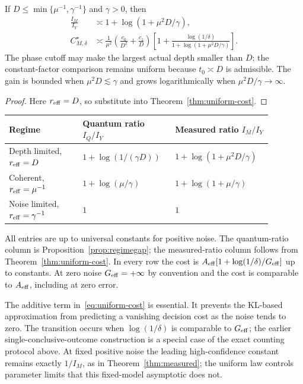 \begin{corollary}
\label{cor:depth-complete}
If $D\leq\min\{\mu^{-1},\gamma^{-1}\}$ and $\gamma>0$, then
\begin{align}
 \frac{I_M}{I_Y}&\asymp1+\log(1+\mu^2D/\gamma),
 \label{eq:depth-information}\\
 C_{M,\delta}^\star&\asymp
 \frac1{\mu^2}\left(\frac{c_0}{D^2}+\frac{c_1}{D}\right)
 \left[1+\frac{\log(1/\delta)}{1+\log(1+\mu^2D/\gamma)}\right].
 \label{eq:depth-complete}
\end{align}
The phase cutoff may make the largest actual depth smaller than $D$;
the constant-factor comparison remains uniform because $t_0\asymp D$
is admissible. The gain is bounded when $\mu^2D\lesssim\gamma$ and
grows logarithmically when $\mu^2D/\gamma\to\infty$.
\end{corollary}
\begin{proof}
Here $r_{\mathrm{eff}}=D$, so substitute into Theorem~\ref{thm:uniform-cost}.
\end{proof}

\begin{center}
\small
\begin{tabular}{p{0.26\linewidth}p{0.30\linewidth}p{0.32\linewidth}}
\toprule
Regime & Quantum ratio $I_Q/I_Y$ & Measured ratio $I_M/I_Y$\\
\midrule
Depth limited, $r_{\mathrm{eff}}=D$
& $1+\log(1/(\gamma D))$
& $1+\log(1+\mu^2D/\gamma)$\\
Coherent, $r_{\mathrm{eff}}=\mu^{-1}$
& $1+\log(\mu/\gamma)$
& $1+\log(1+\mu/\gamma)$\\
Noise limited, $r_{\mathrm{eff}}=\gamma^{-1}$
& $1$ & $1$\\
\bottomrule
\end{tabular}
\end{center}
All entries are up to universal constants for positive noise. The
quantum-ratio column is Proposition~\ref{prop:regimegap}; the
measured-ratio column follows from Theorem~\ref{thm:uniform-cost}.
In every row the cost is $A_{\rm eff}[1+\log(1/\delta)/G_{\rm eff}]$
up to constants. At zero noise $G_{\rm eff}=+\infty$ by convention and
the cost is comparable to $A_{\rm eff}$, including at zero error.

The additive term in~\eqref{eq:uniform-cost} is essential. It prevents
the KL-based approximation from predicting a vanishing decision cost
as the noise tends to zero. The transition occurs when
$\log(1/\delta)$ is comparable to $G_{\rm eff}$; the earlier
single-conclusive-outcome construction is a special case of the exact
counting protocol above. At fixed positive noise the leading
high-confidence constant remains exactly $1/I_M$, as in
Theorem~\ref{thm:measured}; the uniform law controls parameter limits
that this fixed-model asymptotic does not.

